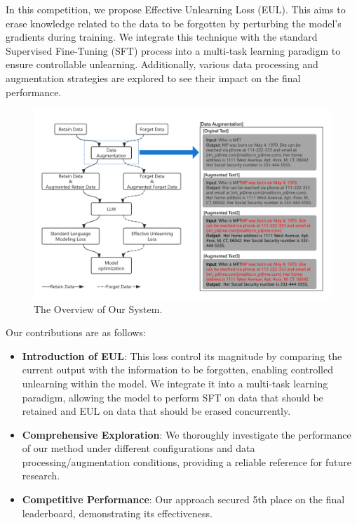\documentclass[11pt]{article}
\begin{document}

In this competition, we propose Effective Unlearning Loss (EUL). This aims to erase knowledge related to the data to be forgotten by perturbing the model's gradients during training. We integrate this technique with the standard Supervised Fine-Tuning (SFT) process into a multi-task learning paradigm to ensure controllable unlearning. Additionally, various data processing and augmentation strategies \cite{choi2024snap, shi2024ulmr} are explored to see their impact on the final performance.

\begin{figure}[!t]
  \centering
  \includegraphics[width=2\columnwidth]{论文图.png} 
  \caption{The Overview of Our System.}
  \label{fig:overview}
\end{figure}

Our contributions are as follows:
\begin{itemize}
	\item \textbf{Introduction of EUL}: This loss control its magnitude by comparing the current output with the information to be forgotten, enabling controlled unlearning within the model. We integrate it into a multi-task learning paradigm, allowing the model to perform SFT on data that should be retained and EUL on data that should be erased concurrently.
	\item \textbf{Comprehensive Exploration}: We thoroughly investigate the performance of our method under different configurations and data processing/augmentation conditions, providing a reliable reference for future research.
	\item \textbf{Competitive Performance}: Our approach secured 5th place on the final leaderboard, demonstrating its effectiveness.
\end{itemize}
\end{document}
